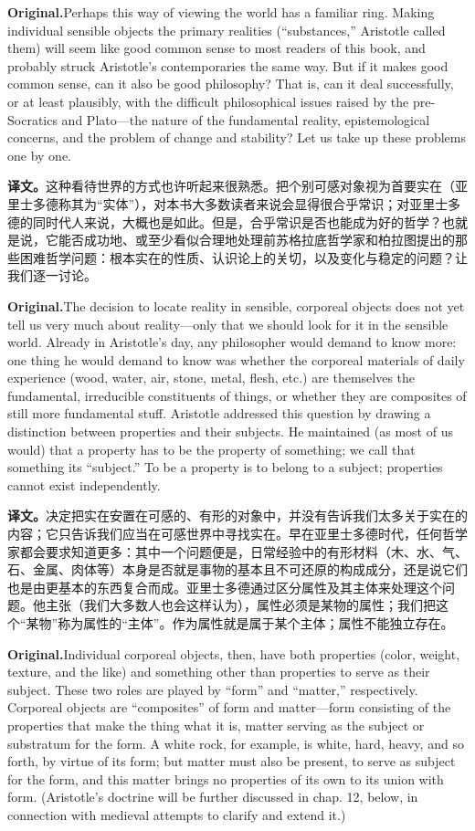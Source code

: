 \documentclass[UTF8]{ctexart}
\newcommand{\orig}{\par\noindent\textbf{Original.}\quad}
\newcommand{\zh}{\par\noindent\textbf{译文。}\quad}
\begin{document}
\orig Perhaps this way of viewing the world has a familiar ring. Making individual sensible objects the primary realities (``substances,'' Aristotle called them) will seem like good common sense to most readers of this book, and probably struck Aristotle's contemporaries the same way. But if it makes good common sense, can it also be good philosophy? That is, can it deal successfully, or at least plausibly, with the difficult philosophical issues raised by the pre-Socratics and Plato---the nature of the fundamental reality, epistemological concerns, and the problem of change and stability? Let us take up these problems one by one.

\zh 这种看待世界的方式也许听起来很熟悉。把个别可感对象视为首要实在（亚里士多德称其为“实体”），对本书大多数读者来说会显得很合乎常识；对亚里士多德的同时代人来说，大概也是如此。但是，合乎常识是否也能成为好的哲学？也就是说，它能否成功地、或至少看似合理地处理前苏格拉底哲学家和柏拉图提出的那些困难哲学问题：根本实在的性质、认识论上的关切，以及变化与稳定的问题？让我们逐一讨论。

\orig The decision to locate reality in sensible, corporeal objects does not yet tell us very much about reality---only that we should look for it in the sensible world. Already in Aristotle's day, any philosopher would demand to know more: one thing he would demand to know was whether the corporeal materials of daily experience (wood, water, air, stone, metal, flesh, etc.) are themselves the fundamental, irreducible constituents of things, or whether they are composites of still more fundamental stuff. Aristotle addressed this question by drawing a distinction between properties and their subjects. He maintained (as most of us would) that a property has to be the property of something; we call that something its ``subject.'' To be a property is to belong to a subject; properties cannot exist independently.

\zh 决定把实在安置在可感的、有形的对象中，并没有告诉我们太多关于实在的内容；它只告诉我们应当在可感世界中寻找实在。早在亚里士多德时代，任何哲学家都会要求知道更多：其中一个问题便是，日常经验中的有形材料（木、水、气、石、金属、肉体等）本身是否就是事物的基本且不可还原的构成成分，还是说它们也是由更基本的东西复合而成。亚里士多德通过区分属性及其主体来处理这个问题。他主张（我们大多数人也会这样认为），属性必须是某物的属性；我们把这个“某物”称为属性的“主体”。作为属性就是属于某个主体；属性不能独立存在。

\orig Individual corporeal objects, then, have both properties (color, weight, texture, and the like) and something other than properties to serve as their subject. These two roles are played by ``form'' and ``matter,'' respectively. Corporeal objects are ``composites'' of form and matter---form consisting of the properties that make the thing what it is, matter serving as the subject or substratum for the form. A white rock, for example, is white, hard, heavy, and so forth, by virtue of its form; but matter must also be present, to serve as subject for the form, and this matter brings no properties of its own to its union with form. (Aristotle's doctrine will be further discussed in chap. 12, below, in connection with medieval attempts to clarify and extend it.)
\end{document}

